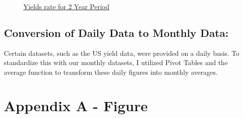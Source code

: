 \documentclass[10pt]{article}
\begin{document}
\begin{figure}[H]
    \centering
    \caption{\hyperref[Yields20]{Yields rate for 2 Year Period}}
    \label{Series}
\end{figure}

\subsection{Conversion of Daily Data to Monthly Data:}

Certain datasets, such as the US yield data, were provided on a daily basis. To standardize this with our monthly datasets, I utilized Pivot Tables and the average function to transform these daily figures into monthly averages.

\printbibliography

\newpage

\appendix

\section{Appendix A - Figure}
\begin{lstlisting}[language=R]

\end{lstlisting}
\end{document}
